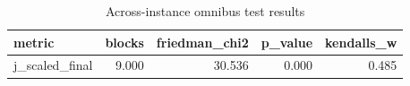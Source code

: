 \begin{table}[!t]
\centering
\caption{Across-instance omnibus test results}
\label{tab:friedman_omnibus_generated}
\begin{tabular}{lrrrr}
\toprule
metric & blocks & friedman_chi2 & p_value & kendalls_w \\
\midrule
j_scaled_final & 9.000 & 30.536 & 0.000 & 0.485 \\
\bottomrule
\end{tabular}

\end{table}